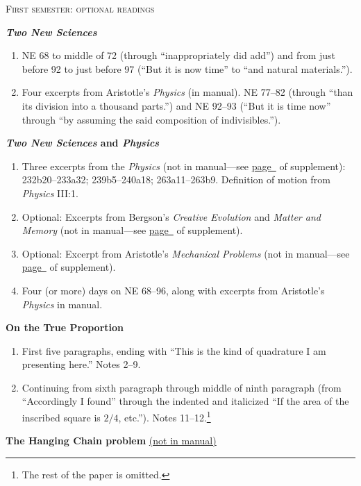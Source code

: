 \documentclass[10pt]{article}
\begin{document}
{\bigskip
\begin{center}
	\textsc{\small{First semester: optional readings}}
\end{center}
\textbf{\emph{Two New Sciences}} \label{Galileo}
\begin{enumerate}[noitemsep]
	\item NE 68 to
	middle of 72 (through ``inappropriately
	did add'') and from just before 92 to just before 97
	(``But it is now time'' to ``and
	natural materials.''). 
\item Four excerpts from
	Aristotle’s \emph{Physics} (in manual). NE 77--82 (through
	``than its division into a thousand parts.'')
	and NE 92--93 (``But it is time now'' through
	``by assuming the said composition of
	indivisibles.''). 
\end{enumerate}
\textbf{\emph{Two New Sciences} and \emph{Physics}}
\begin{enumerate}[noitemsep]
	\item Three excerpts from the \emph{Physics} (not
		in manual---see 
		\hyperref[supple.1]{page~\pageref{supple.1}}
		of supplement):
		232b20--233a32; 239b5--240a18;
		263a11--263b9. Definition of motion from
		\emph{Physics} III:1. 
	\item Optional: Excerpts from Bergson's \emph{Creative Evolution} and
		\emph{Matter and Memory} (not in
		manual---see
		\hyperref[supple.7]{page~\pageref{supple.7}}
		of supplement).
	\item Optional: Excerpt from Aristotle's \emph{Mechanical
			Problems} (not in manual---see
		\hyperref[supple.4]{page~\pageref{supple.4}}
		of supplement).
	\item Four (or more) days on NE 68--96, along with
		excerpts from Aristotle's \emph{Physics} in
		manual.
\end{enumerate}
\textbf{On the True Proportion}
	\label{LeibnizProp}
	\begin{enumerate}[noitemsep]
		\item First five paragraphs, ending with ``This is
	the kind of quadrature I am presenting here.'' Notes
	2--9. \item Continuing from sixth paragraph
	through middle of ninth paragraph (from
	``Accordingly I found'' through the indented and
	italicized ``If the area of the
	inscribed square is $2/4$, etc.''). Notes
	11--12.\footnote{The rest of the paper is omitted.}
\end{enumerate}
\textbf{The Hanging Chain problem} \href{https://drive.google.com/file/d/1Q06ypQH26GPMVsxn8SRQVEEn79qmUxOE/view?usp=sharing}{(not in manual)}
\label{LeibnizHang}

}
\end{document}
